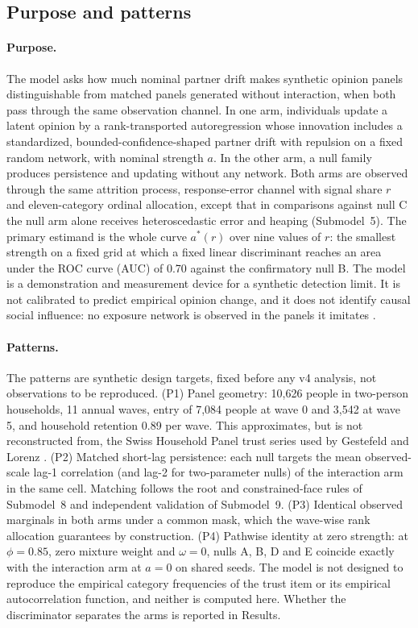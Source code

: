 \subsection{Purpose and patterns}

\paragraph{Purpose.}
The model asks how much nominal partner drift makes synthetic opinion panels distinguishable from matched panels generated without interaction, when both pass through the same observation channel. In one arm, individuals update a latent opinion by a rank-transported autoregression whose innovation includes a standardized, bounded-confidence-shaped partner drift with repulsion on a fixed random network, with nominal strength $a$. In the other arm, a null family produces persistence and updating without any network. Both arms are observed through the same attrition process, response-error channel with signal share $r$ and eleven-category ordinal allocation, except that in comparisons against null C the null arm alone receives heteroscedastic error and heaping (Submodel~5). The primary estimand is the whole curve $a^*(r)$ over nine values of $r$: the smallest strength on a fixed grid at which a fixed linear discriminant reaches an area under the ROC curve (AUC) of 0.70 against the confirmatory null B. The model is a demonstration and measurement device for a synthetic detection limit. It is not calibrated to predict empirical opinion change, and it does not identify causal social influence: no exposure network is observed in the panels it imitates \cite{manski1993,shalizi2011}.

\paragraph{Patterns.}
The patterns are synthetic design targets, fixed before any v4 analysis, not observations to be reproduced. (P1) Panel geometry: 10,626 people in two-person households, 11 annual waves, entry of 7,084 people at wave 0 and 3,542 at wave 5, and household retention 0.89 per wave. This approximates, but is not reconstructed from, the Swiss Household Panel trust series used by Gestefeld and Lorenz \cite{gestefeld2023}. (P2) Matched short-lag persistence: each null targets the mean observed-scale lag-1 correlation (and lag-2 for two-parameter nulls) of the interaction arm in the same cell. Matching follows the root and constrained-face rules of Submodel~8 and independent validation of Submodel~9. (P3) Identical observed marginals in both arms under a common mask, which the wave-wise rank allocation guarantees by construction. (P4) Pathwise identity at zero strength: at $\phi=0.85$, zero mixture weight and $\omega=0$, nulls A, B, D and E coincide exactly with the interaction arm at $a=0$ on shared seeds. The model is not designed to reproduce the empirical category frequencies of the trust item or its empirical autocorrelation function, and neither is computed here. Whether the discriminator separates the arms is reported in Results.

